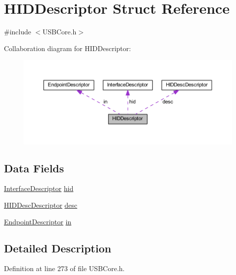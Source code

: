 \hypertarget{struct_h_i_d_descriptor}{}\section{H\+I\+D\+Descriptor Struct Reference}
\label{struct_h_i_d_descriptor}


{\ttfamily \#include $<$U\+S\+B\+Core.\+h$>$}



Collaboration diagram for H\+I\+D\+Descriptor\+:
\nopagebreak
\begin{figure}[H]
\begin{center}
\leavevmode
\includegraphics[width=350pt]{struct_h_i_d_descriptor__coll__graph}
\end{center}
\end{figure}
\subsection*{Data Fields}
\begin{DoxyCompactItemize}
\item 
\hyperlink{struct_interface_descriptor}{Interface\+Descriptor} \hyperlink{struct_h_i_d_descriptor_a81907e74fcb6fd20130a4a921e4be5fd}{hid}
\item 
\hyperlink{struct_h_i_d_desc_descriptor}{H\+I\+D\+Desc\+Descriptor} \hyperlink{struct_h_i_d_descriptor_ae46b89dcb6c43addf455fc25ebbf9963}{desc}
\item 
\hyperlink{struct_endpoint_descriptor}{Endpoint\+Descriptor} \hyperlink{struct_h_i_d_descriptor_a93dcef3b3e3062b904269bcad94771b5}{in}
\end{DoxyCompactItemize}


\subsection{Detailed Description}


Definition at line 273 of file U\+S\+B\+Core.\+h.




